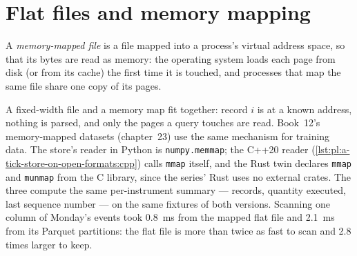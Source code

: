 \begin{omfigure}

\label{fig:pl:a-tick-store-on-open-formats:times}
\end{omfigure}

\section{Flat files and memory mapping}

\begin{definition}\label{def:pl:a-tick-store-on-open-formats:mmap}
A \emph{memory-mapped file} is a file mapped into a process's virtual address space, so that its bytes
are read as memory: the operating system loads each page from disk (or from its cache) the first time it is touched, and
processes that map the same file share one copy of its pages.
\end{definition}

A fixed-width file and a memory map fit together: record $i$ is at a known address, nothing is parsed, and only the pages a
query touches are read. Book~12's memory-mapped datasets (chapter~23) use the same mechanism for training data. The store's reader
in Python is \texttt{numpy.memmap}; the C++20 reader (\cref{lst:pl:a-tick-store-on-open-formats:cpp}) calls \texttt{mmap}
itself, and the Rust twin declares \texttt{mmap} and \texttt{munmap} from the C library, since the series' Rust uses no external
crates. The three compute the same per-instrument summary --- records, quantity executed, last sequence number --- on the same
fixtures of both versions. Scanning one column of Monday's events took 0.8~ms from the mapped flat file and 2.1~ms from its
Parquet partitions: the flat file is more than twice as fast to scan and 2.8 times larger to keep.

